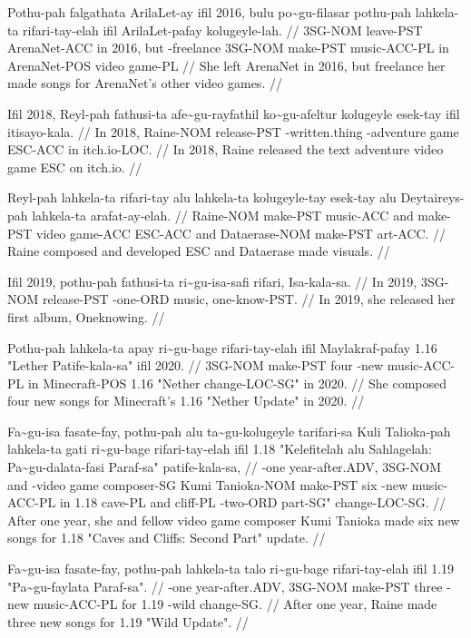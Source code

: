 \ex
\begingl
\gla Pothu-pah falgathata ArilaLet-ay ifil 2016, bulu po\~{}gu-filasar pothu-pah lahkela-ta rifari-tay-elah ifil ArilaLet-pafay   kolugeyle-lah. //
\glb 3SG-NOM leave-PST ArenaNet-ACC in 2016, but \agradj{}-freelance 3SG-NOM make-PST music-ACC-PL in ArenaNet-POS  video game-PL //
\glft She left ArenaNet in 2016, but freelance her made songs for ArenaNet's other video games. //
\endgl
\xe

\ex
\begingl
\gla Ifil 2018, Reyl-pah fathusi-ta  afe\~{}gu-rayfathil ko\~{}gu-afeltur kolugeyle esek-tay ifil itisayo-kala. //
\glb In 2018, Raine-NOM release-PST  \agradj{}-written.thing \agradj{}-adventure game ESC-ACC in itch.io-LOC. //
\glft In 2018, Raine released the text adventure video game ESC on itch.io. //
\endgl
\xe

\ex
\begingl
\gla Reyl-pah lahkela-ta rifari-tay alu lahkela-ta kolugeyle-tay esek-tay alu Deytaireys-pah lahkela-ta arafat-ay-elah. //
\glb Raine-NOM make-PST music-ACC and make-PST video game-ACC ESC-ACC and Dataerase-NOM make-PST art-ACC. //
\glft Raine composed and developed ESC and Dataerase made visuals. //
\endgl
\xe

\ex
\begingl
\gla Ifil 2019, pothu-pah fathusi-ta  ri\~{}gu-isa-safi rifari, Isa-kala-sa. //
\glb In 2019, 3SG-NOM release-PST  \agradj{}-one-ORD music, one-know-PST. //
\glft In 2019, she released her first album, Oneknowing. //
\endgl
\xe

\ex
\begingl
\gla Pothu-pah lahkela-ta apay ri\~{}gu-bage rifari-tay-elah ifil Maylakraf-pafay 1.16 "Lether Patife-kala-sa" ifil 2020. //
\glb 3SG-NOM make-PST four \agradj{}-new music-ACC-PL in Minecraft-POS 1.16 "Nether change-LOC-SG" in 2020. //
\glft She composed four new songs for Minecraft's 1.16 "Nether Update" in 2020. //
\endgl
\xe

\ex
\begingl
\gla Fa\~{}gu-isa fasate-fay, pothu-pah alu  ta\~{}gu-kolugeyle tarifari-sa Kuli Talioka-pah lahkela-ta gati ri\~{}gu-bage rifari-tay-elah ifil 1.18 "Kelefitelah alu Sahlagelah: Pa\~{}gu-dalata-fasi Paraf-sa" patife-kala-sa, //
\glb \agradj{}-one year-after.ADV, 3SG-NOM and  \agradj{}-video game composer-SG Kumi Tanioka-NOM make-PST six \agradj{}-new music-ACC-PL in 1.18 cave-PL and cliff-PL \agradj{}-two-ORD part-SG" change-LOC-SG. //
\glft After one year, she and fellow video game composer Kumi Tanioka  made six new songs for 1.18 "Caves and Cliffs: Second Part" update. //
\endgl
\xe

\ex
\begingl
\gla Fa\~{}gu-isa fasate-fay, pothu-pah lahkela-ta talo ri\~{}gu-bage rifari-tay-elah ifil 1.19 "Pa\~{}gu-faylata Paraf-sa". //
\glb \agradj{}-one year-after.ADV, 3SG-NOM make-PST three \agradj{}-new music-ACC-PL for 1.19 \agradj{}-wild change-SG. //
\glft After one year, Raine made three new songs for 1.19 "Wild Update". //
\endgl
\xe

